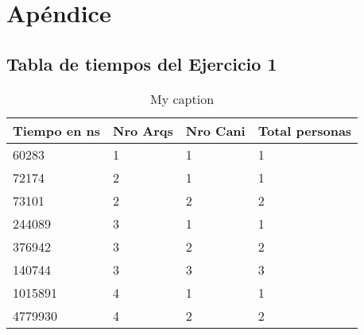 \section{Apéndice}\label{sec:codigo}

\subsection{Tabla de tiempos del Ejercicio 1}

\begin{table}[H]
\centering
\caption{My caption}
\label{my-label}
\begin{tabular}{llll}
\hline
\multicolumn{1}{|l|}{\textbf{Tiempo en ns}} & \multicolumn{1}{l|}{\textbf{Nro Arqs}} & \multicolumn{1}{l|}{\textbf{Nro Cani}} & \multicolumn{1}{l|}{\textbf{Total personas}} \\ \hline
60283                                       & 1                                      & 1                                      & 1                                            \\
72174                                       & 2                                      & 1                                      & 1                                            \\
73101                                       & 2                                      & 2                                      & 2                                            \\
244089                                      & 3                                      & 1                                      & 1                                            \\
376942                                      & 3                                      & 2                                      & 2                                            \\
140744                                      & 3                                      & 3                                      & 3                                            \\
1015891                                     & 4                                      & 1                                      & 1                                            \\
4779930                                     & 4                                      & 2                                      & 2                                            \\

\end{tabular}
\end{table}
